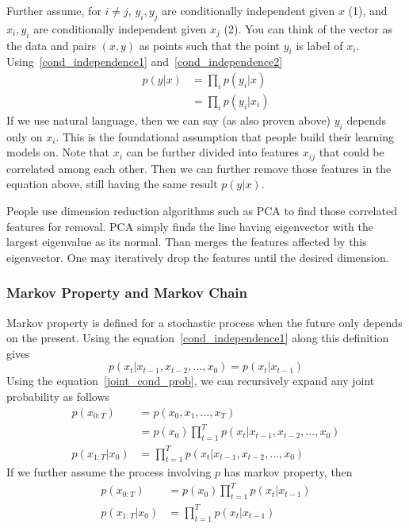 \documentclass{article}
\numberwithin{equation}{subsection}
\begin{document}
Further assume, for $i \neq j$, $y_i, y_j$ are conditionally independent given $x$ (1), and $x_i, y_i$ are conditionally independent given $x_j$ (2). You can think of the vector as the data and pairs $(x,y)$ as points such that the point $y_i$ is label of $x_i$. Using~\ref{cond_independence1} and~\ref{cond_independence2}
\begin{align}
    p(y|x) &= \prod_i p(y_i|x)\\
           &= \prod_i p(y_i|x_i)
\end{align}
If we use natural language, then we can say (as also proven above) $y_i$ depends only on $x_i$. This is the foundational assumption that people build their learning models on. Note that $x_i$ can be further divided into features $x_{ij}$ that could be correlated among each other. Then we can further remove those features in the equation above, still having the same result $p(y|x)$. 

People use dimension reduction algorithms such as PCA to find those correlated features for removal. PCA simply finds the line having eigenvector with the largest eigenvalue as its normal. Than merges the features affected by this eigenvector. One may iteratively drop the features until the desired dimension.
\subsubsection{Markov Property and Markov Chain}
Markov property is defined for a stochastic process when the future only depends on the present. Using the equation~\ref{cond_independence1} along this definition gives
\begin{equation}
    p(x_t|x_{t-1},x_{t-2},...,x_0) = p(x_t|x_{t-1})
\end{equation}
Using the equation~\ref{joint_cond_prob}, we can recursively expand any joint probability as follows
\begin{align}
    p(x_{0:T}) &= p(x_0,x_1,...,x_T) \\
    &= p(x_0)\prod_{t=1}^T p(x_t|x_{t-1},x_{t-2},...,x_0)\\
    p(x_{1:T}|x_0) &= \prod_{t=1}^T p(x_t|x_{t-1},x_{t-2},...,x_0)
\end{align}
If we further assume the process involving $p$ has markov property, then
\begin{align}
    p(x_{0:T}) &= p(x_0)\prod_{t=1}^T p(x_t|x_{t-1}) \label{markov_chain_joint}\\
    p(x_{1:T}|x_0) &= \prod_{t=1}^T p(x_t|x_{t-1}) \label{markov_chain_cond}
\end{align}
\end{document}
